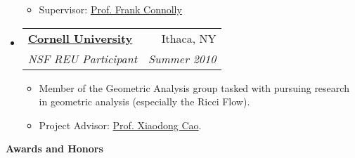 \documentclass[letterpaper,11pt]{article}
\makeatletter
\newcommand{\resitem}[1]{\item #1 \vspace{-2pt}}
\newcommand{\resheading}[1]{{\large {\textbf{#1 \vphantom{p\^{E}}}}}}
\newenvironment{widetable}[1]
	       {\begin{tabular*}{#1}[t]{l@{\extracolsep{\fill}}r}}
	       {\end{tabular*}}
\newcommand{\ressubheading}[4]{
  \begin{widetable}{\textwidth - 28pt}
		\textbf{#1} & #2 \\
		\textit{#3} & \textit{#4} \\
  \end{widetable}
  \vspace{-12pt}}
\makeatother
\begin{document}
\begin{itemize}
\begin{itemize}
                  \resitem{Supervisor: \href{http://math.nd.edu/people/faculty/francis-x-connolly/}{Prof. Frank Connolly}}
		\end{itemize}
		\item
		  \ressubheading{\href{http://www.math.cornell.edu}{Cornell University}}
		{Ithaca, NY}
		{NSF REU Participant}
		{Summer 2010}
		  \begin{itemize}
		    \resitem{Member of the Geometric Analysis group tasked with pursuing research in geometric analysis (especially the Ricci Flow). }
		    \resitem{Project Advisor: \href{http://www.math.cornell.edu/~cao/}{Prof. Xiaodong Cao}.}
		  \end{itemize}

\end{itemize}
\pagebreak

\resheading{Awards and Honors}
\end{document}
